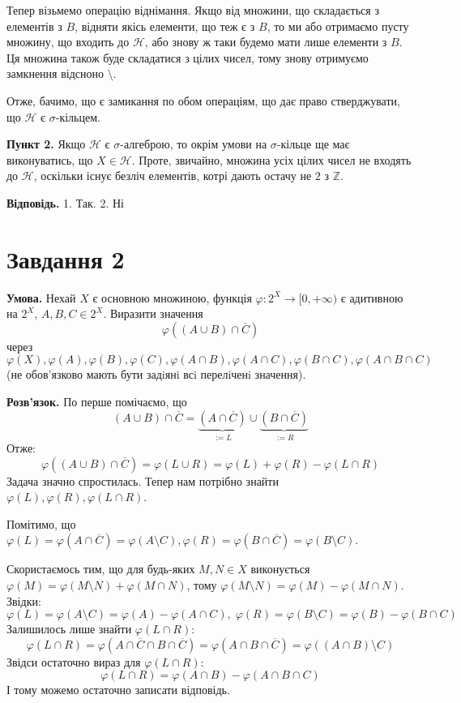 \documentclass[14pt]{extarticle}
\begin{document}
Тепер візьмемо операцію віднімання. Якщо від множини, що складається з елементів з $B$, відняти якісь елементи, що теж є з $B$, то ми або отримаємо пусту множину, що входить до $\mathcal{H}$, або знову ж таки будемо мати лише елементи з $B$. Ця множина також буде складатися з цілих чисел, тому знову отримуємо замкнення відсноно $\setminus$.

Отже, бачимо, що є замикання по обом операціям, що дає право стверджувати, що $\mathcal{H}$ є $\sigma$-кільцем.

\textbf{Пункт 2.} Якщо $\mathcal{H}$ є $\sigma$-алгеброю, то окрім умови на $\sigma$-кільце ще має виконуватись, що $X \in \mathcal{H}$. Проте, звичайно, множина усіх цілих чисел не входять до $\mathcal{H}$, оскільки існує безліч елементів, котрі дають остачу не $2$ з $\mathbb{Z}$. 

\textbf{Відповідь.} 1. Так. 2. Ні

\section*{Завдання 2}

\textbf{Умова.} Нехай $X$ є основною множиною, функція $\varphi: 2^X \to [0,+\infty)$ є адитивною на $2^X$, $A,B,C \in 2^X$. Виразити значення
\[
\varphi((A \cup B) \cap \overline{C})
\]
через $\varphi(X),\varphi(A),\varphi(B),\varphi(C),\varphi(A\cap B),\varphi(A \cap C),\varphi(B \cap C), \varphi(A \cap B \cap C)$ (не обов’язково мають бути задiянi всi перелiченi значення).

\textbf{Розв'язок.} По перше помічаємо, що
\[
(A \cup B) \cap \overline{C} = \underbrace{(A \cap \overline{C})}_{:=L} \cup \underbrace{(B \cap \overline{C})}_{:=R}
\]
Отже:
\[
\varphi((A \cup B) \cap \overline{C}) = \varphi(L \cup R) = \varphi(L) + \varphi(R) - \varphi(L \cap R)
\]
Задача значно спростилась. Тепер нам потрібно знайти $\varphi(L),\varphi(R),\varphi(L \cap R)$.

Помітимо, що $\varphi(L)=\varphi(A \cap \overline{C})=\varphi(A \setminus C), \varphi(R)=\varphi(B \cap \overline{C}) = \varphi(B\setminus C)$. 

Скористаємось тим, що для будь-яких $M,N \in X$ виконується $\varphi(M) = \varphi(M\setminus N)+ \varphi(M \cap N)$, тому $\varphi(M \setminus N) = \varphi(M) - \varphi(M \cap N)$. Звідки:
\[
\varphi(L) = \varphi(A \setminus C) = \varphi(A) - \varphi(A \cap C), \; \varphi(R) = \varphi(B \setminus C)= \varphi(B) - \varphi(B \cap C)
\]
Залишилось лише знайти $\varphi(L \cap R)$:
\[
\varphi(L \cap R) = \varphi(A \cap \overline{C} \cap B \cap \overline{C}) = \varphi(A \cap B \cap \overline{C}) = \varphi((A \cap B) \setminus C)
\]
Звідси остаточно вираз для $\varphi(L \cap R)$:
\[
\varphi(L \cap R) = \varphi(A \cap B) - \varphi(A \cap B \cap C)
\]
І тому можемо остаточно записати відповідь.
\end{document}

